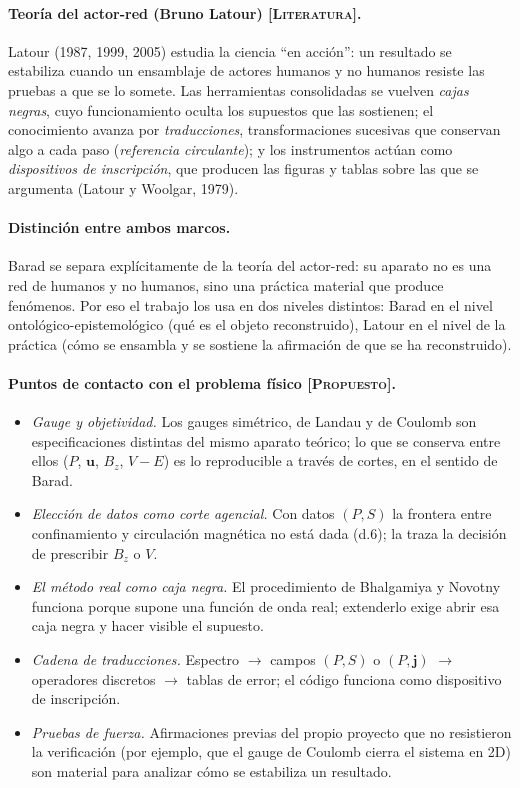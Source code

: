 \documentclass[12pt,letterpaper]{article}
\newcommand{\uv}{\mathbf{u}}
\newcommand{\jv}{\mathbf{j}}
\newcommand{\LIT}{\textsc{[Literatura]}}
\newcommand{\PRO}{\textsc{[Propuesto]}}
\begin{document}
\paragraph{Teoría del actor-red (Bruno Latour) \LIT.} Latour (1987, 1999, 2005) estudia la ciencia ``en acción'': un
resultado se estabiliza cuando un ensamblaje de actores humanos y no humanos resiste las pruebas a que se lo somete.
Las herramientas consolidadas se vuelven \emph{cajas negras}, cuyo funcionamiento oculta los supuestos que las sostienen;
el conocimiento avanza por \emph{traducciones}, transformaciones sucesivas que conservan algo a cada paso
(\emph{referencia circulante}); y los instrumentos actúan como \emph{dispositivos de inscripción}, que producen las figuras
y tablas sobre las que se argumenta (Latour y Woolgar, 1979).

\paragraph{Distinción entre ambos marcos.} Barad se separa explícitamente de la teoría del actor-red: su aparato no es una
red de humanos y no humanos, sino una práctica material que produce fenómenos. Por eso el trabajo los usa en dos niveles
distintos: Barad en el nivel ontológico-epistemológico (qué es el objeto reconstruido), Latour en el nivel de la práctica
(cómo se ensambla y se sostiene la afirmación de que se ha reconstruido).

\paragraph{Puntos de contacto con el problema físico \PRO.}
\begin{itemize}[leftmargin=1.6em]
  \item \emph{Gauge y objetividad.} Los gauges simétrico, de Landau y de Coulomb son especificaciones distintas del mismo
        aparato teórico; lo que se conserva entre ellos ($P$, $\uv$, $B_z$, $V-E$) es lo reproducible a través de cortes,
        en el sentido de Barad.
  \item \emph{Elección de datos como corte agencial.} Con datos $(P,S)$ la frontera entre confinamiento y circulación
        magnética no está dada (d.6); la traza la decisión de prescribir $B_z$ o $V$.
  \item \emph{El método real como caja negra.} El procedimiento de Bhalgamiya y Novotny funciona porque supone una función
        de onda real; extenderlo exige abrir esa caja negra y hacer visible el supuesto.
  \item \emph{Cadena de traducciones.} Espectro $\to$ campos $(P,S)$ o $(P,\jv)$ $\to$ operadores discretos $\to$ tablas
        de error; el código funciona como dispositivo de inscripción.
  \item \emph{Pruebas de fuerza.} Afirmaciones previas del propio proyecto que no resistieron la verificación (por
        ejemplo, que el gauge de Coulomb cierra el sistema en 2D) son material para analizar cómo se estabiliza un
        resultado.
\end{itemize}
\end{document}
